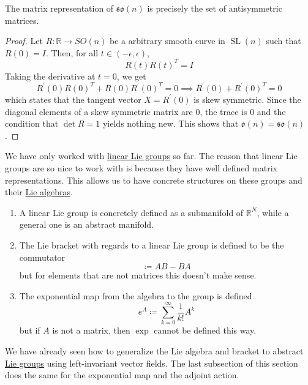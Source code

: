 \documentclass{article}
\DeclareMathOperator{\SL}{SL}
\newcounter{theorem}[section]
\begin{document}
    \begin{theorem}
      \label{thm:matrix-form-of-mathfrakson}
      The matrix representation of $\mathfrak{so}(n)$ is precisely the set of antisymmetric matrices. 
    \end{theorem}
    \begin{proof}
      Let $R: \mathbb{R} \rightarrow SO(n)$ be a arbitrary smooth curve in $\SL(n)$ such that $R(0) = I$. Then, for all $t \in (-\epsilon, \epsilon)$, 
      \begin{equation}
        R(t) R(t)^T = I
      \end{equation}
      Taking the derivative at $t = 0$, we get
      \begin{equation}
        R^\prime (0) R(0)^T + R(0) R^\prime(0)^T = 0 \implies R^\prime (0) + R^\prime(0)^T = 0
      \end{equation}
      which states that the tangent vector $X = R^\prime (0)$ is skew symmetric. Since the diagonal elements of a skew symmetric matrix are $0$, the trace is $0$ and the condition that $\det{R} = 1$ yields nothing new. This shows that $\mathfrak{o}(n) = \mathfrak{so}(n)$. 
    \end{proof}

    We have only worked with \hyperref[def:linear-lie-group]{linear Lie groups} so far. The reason that linear Lie groups are so nice to work with is because they have well defined matrix representations. This allows us to have concrete structures on these groups and their \hyperref[def:lie-algebra]{Lie algebras}. 
    \begin{enumerate}
      \item A linear Lie group is concretely defined as a submanifold of $\mathbb{R}^N$, while a general one is an abstract manifold. 
      \item The Lie bracket with regards to a linear Lie group is defined to be the commutator 
        \begin{equation}
          [A,B] \coloneqq A B - B A
        \end{equation}
      but for elements that are not matrices this doesn't make sense. 

      \item The exponential map from the algebra to the group is defined
        \begin{equation}
          e^A \coloneqq \sum_{k=0}^\infty \frac{1}{k!} A^k
        \end{equation}
      but if $A$ is not a matrix, then $\exp$ cannot be defined this way.
    \end{enumerate}
    We have already seen how to generalize the Lie algebra and bracket to abstract \hyperref[def:lie-group]{Lie groups} using left-invariant vector fields. The last subsection of this section does the same for the exponential map and the adjoint action. 
\end{document}
